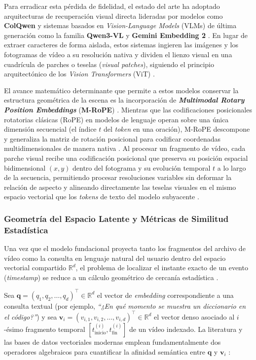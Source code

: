 Para erradicar esta pérdida de fidelidad, el estado del arte ha adoptado arquitecturas de recuperación visual directa lideradas por modelos como \textbf{ColQwen} y sistemas basados en \textit{Vision-Language Models} (VLMs) de última generación como la familia \textbf{Qwen3-VL} y \textbf{Gemini Embedding 2} \cite{prajwal2025multimodal, qwen3_vl_emb2026, gemini_emb2_docs}. En lugar de extraer caracteres de forma aislada, estos sistemas ingieren las imágenes y los fotogramas de vídeo a su resolución nativa y dividen el lienzo visual en una cuadrícula de parches o teselas (\textit{visual patches}), siguiendo el principio arquitectónico de los \textit{Vision Transformers} (ViT) \cite{prajwal2025multimodal}.

El avance matemático determinante que permite a estos modelos conservar la estructura geométrica de la escena es la incorporación de \textbf{\textit{Multimodal Rotary Position Embeddings}} (\textbf{M-RoPE}) \cite{prajwal2025multimodal}. Mientras que las codificaciones posicionales rotatorias clásicas (RoPE) en modelos de lenguaje operan sobre una única dimensión secuencial (el índice $t$ del \textit{token} en una oración), M-RoPE descompone y generaliza la matriz de rotación posicional para codificar coordenadas multidimensionales de manera nativa \cite{prajwal2025multimodal}. Al procesar un fragmento de vídeo, cada parche visual recibe una codificación posicional que preserva su posición espacial bidimensional $(x, y)$ dentro del fotograma y su evolución temporal $t$ a lo largo de la secuencia, permitiendo procesar resoluciones variables sin deformar la relación de aspecto y alineando directamente las teselas visuales en el mismo espacio vectorial que los \textit{tokens} de texto del modelo subyacente \cite{prajwal2025multimodal}.

\subsubsection{Geometría del Espacio Latente y Métricas de Similitud Estadística}
\label{subsubsec:geometria_similitud}

Una vez que el modelo fundacional proyecta tanto los fragmentos del archivo de vídeo como la consulta en lenguaje natural del usuario dentro del espacio vectorial compartido $\mathbb{R}^d$, el problema de localizar el instante exacto de un evento (\textit{timestamp}) se reduce a un cálculo geométrico de cercanía estadística \cite{mixpeek_chunking}.

Sea $\mathbf{q} = (q_1, q_2, \dots, q_d)^\top \in \mathbb{R}^d$ el vector de \textit{embedding} correspondiente a una consulta textual (por ejemplo, \textit{``¿En qué momento se muestra un diccionario en el código?''}) y sea $\mathbf{v}_i = (v_{i,1}, v_{i,2}, \dots, v_{i,d})^\top \in \mathbb{R}^d$ el vector denso asociado al $i$-ésimo fragmento temporal $[t_{\text{inicio}}^{(i)}, t_{\text{fin}}^{(i)}]$ de un vídeo indexado. La literatura y las bases de datos vectoriales modernas emplean fundamentalmente dos operadores algebraicos para cuantificar la afinidad semántica entre $\mathbf{q}$ y $\mathbf{v}_i$ \cite{learnopencv_qwen3, gemini_emb2_docs}:

